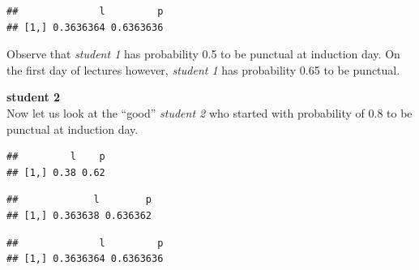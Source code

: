 \documentclass[]{article}
\newenvironment{Shaded}{\begin{snugshade}}{\end{snugshade}}
\newcommand{\CommentTok}[1]{\textcolor[rgb]{0.56,0.35,0.01}{\textit{#1}}}
\newcommand{\DecValTok}[1]{\textcolor[rgb]{0.00,0.00,0.81}{#1}}
\newcommand{\FloatTok}[1]{\textcolor[rgb]{0.00,0.00,0.81}{#1}}
\newcommand{\KeywordTok}[1]{\textcolor[rgb]{0.13,0.29,0.53}{\textbf{#1}}}
\newcommand{\NormalTok}[1]{#1}
\newcommand{\OperatorTok}[1]{\textcolor[rgb]{0.81,0.36,0.00}{\textbf{#1}}}
\newcommand{\StringTok}[1]{\textcolor[rgb]{0.31,0.60,0.02}{#1}}
\begin{document}
\begin{verbatim}
##              l         p
## [1,] 0.3636364 0.6363636
\end{verbatim}

Observe that \emph{student 1} has probability 0.5 to be punctual at
induction day. On the first day of lectures however, \emph{student 1}
has probability 0.65 to be punctual.

\textbf{student 2}\\
Now let us look at the ``good'' \emph{student 2} who started with
probability of \(0.8\) to be punctual at induction day.

\begin{Shaded}
\end{Shaded}

\begin{verbatim}
##         l    p
## [1,] 0.38 0.62
\end{verbatim}

\begin{Shaded}
\end{Shaded}

\begin{verbatim}
##             l        p
## [1,] 0.363638 0.636362
\end{verbatim}

\begin{Shaded}
\end{Shaded}

\begin{verbatim}
##              l         p
## [1,] 0.3636364 0.6363636
\end{verbatim}
\end{document}
